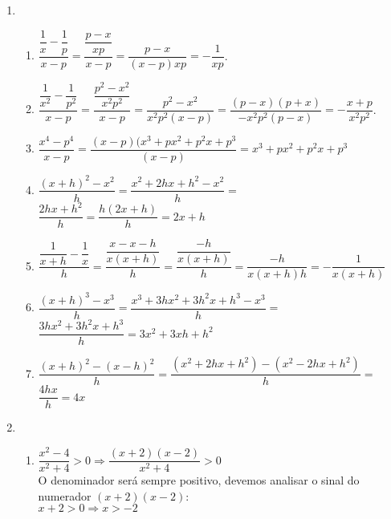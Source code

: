 \documentclass[10pt]{book}
\begin{document}
\begin{enumerate}
\begin{enumerate}
		\end{enumerate}
		\item %
		\begin{enumerate}
			\addtocounter{enumii}{7}
			\item %
			$\dfrac{\dfrac{1}{x}-\dfrac{1}{p}}{x - p} = \dfrac{\dfrac{p - x}{xp}}{x - p} = \dfrac{p - x}{(x - p)xp} = -\dfrac{1}{xp}$.\\
			\item %
			$\dfrac{\dfrac{1}{x^2}-\dfrac{1}{p^2}}{x-p} = \dfrac{\dfrac{p^2-x^2}{x^2p^2}}{x-p} = \dfrac{p^2-x^2}{x^2p^2(x-p)} = \dfrac{(p-x)(p+x)}{-x^2p^2(p-x)} = -\dfrac{x+p}{x^2p^2}$.\\
			\addtocounter{enumii}{1}
			\item %
			$\dfrac{x^4-p^4}{x-p} = \dfrac{(x-p)(x^3+px^2+p^2x+p^3}{(x-p)} = x^3+px^2+p^2x+p^3$\\
			\item %
			$\dfrac{(x+h)^2-x^2}{h} = \dfrac{x^2+2hx+h^2-x^2}{h} =$\\
			$ \dfrac{2hx + h^2}{h} = \dfrac{h(2x + h)}{h} = 2x + h$\\
			\item %
			$\dfrac{\dfrac{1}{x+h}-\dfrac{1}{x}}{h} = \dfrac{\dfrac{x-x-h}{x(x+h)}}{h} = \dfrac{\dfrac{-h}{x(x+h)}}{h}=\dfrac{-h}{x(x+h)h} = -\dfrac{1}{x(x+h)}$\\
			\item %
			$\dfrac{(x+h)^3-x^3}{h} = \dfrac{x^3+3hx^2+3h^2x+h^3-x^3}{h} =$\\ 						$\dfrac{3hx^2+3h^2x+h^3}{h} = 3x^2+3xh+h^2$\\
			\item %
			$\dfrac{(x+h)^2-(x-h)^2}{h} = \dfrac{(x^2+2hx+h^2)-(x^2-2hx+h^2)}{h} =$\\ 
			$\dfrac{4hx}{h} = 4x$\\
		\end{enumerate}
		\item %
		\begin{enumerate}
			\addtocounter{enumii}{5}
			\item %
			$\dfrac{x^2 - 4}{x^2 + 4} > 0 \Rightarrow \dfrac{(x + 2)(x - 2)}{x^2 + 4} > 0$\\
			O denominador será sempre positivo, devemos analisar o sinal do numerador $(x + 2)(x - 2)$:\\
			$x + 2 > 0 \Rightarrow x > -2$\\

\end{enumerate}
\end{enumerate}
\end{document}
